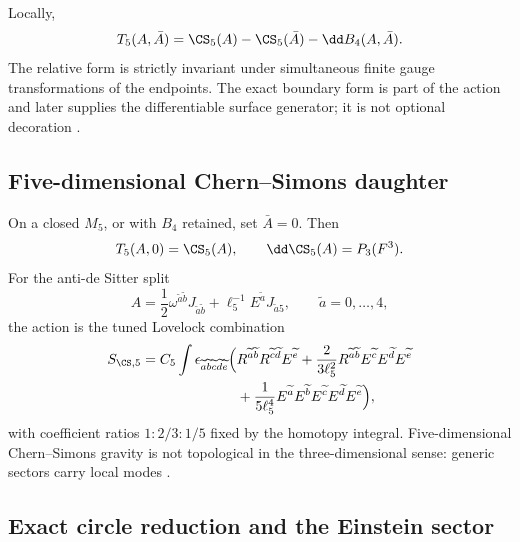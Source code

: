 Locally,
\[
T_5(A,\bar A)=\CS_5(A)-\CS_5(\bar A)-\dd B_4(A,\bar A).
\]
The relative form is strictly invariant under simultaneous finite gauge transformations of the endpoints.  The exact boundary form is part of the action and later supplies the differentiable surface generator; it is not optional decoration \citep{MoraOleaTroncosoZanelli2006,PaisSalgadoRebolledoVera2023}.

\subsection{Five-dimensional Chern--Simons daughter}

On a closed $M_5$, or with $B_4$ retained, set $\bar A=0$.  Then
\[
T_5(A,0)=\CS_5(A),
\qquad
\dd\CS_5(A)=P_3(F^3).
\]
For the anti-de Sitter split
\[
A=\frac12\omega^{\widetilde a\widetilde b}J_{\widetilde a\widetilde b}
+\ell_5^{-1}E^{\widetilde a}J_{\widetilde a5},
\qquad \widetilde a=0,\ldots,4,
\]
the action is the tuned Lovelock combination
\[
\begin{aligned}
S_{\CS,5}=C_5\int\epsilon_{\widetilde a\widetilde b\widetilde c\widetilde d\widetilde e}
\Big(&R^{\widetilde a\widetilde b}R^{\widetilde c\widetilde d}E^{\widetilde e}
+\frac{2}{3\ell_5^2}R^{\widetilde a\widetilde b}E^{\widetilde c}E^{\widetilde d}E^{\widetilde e}\\
&+\frac{1}{5\ell_5^4}E^{\widetilde a}E^{\widetilde b}E^{\widetilde c}E^{\widetilde d}E^{\widetilde e}\Big),
\end{aligned}
\]
with coefficient ratios $1:2/3:1/5$ fixed by the homotopy integral.  Five-dimensional Chern--Simons gravity is not topological in the three-dimensional sense: generic sectors carry local modes \citep{Chamseddine1989,BanadosGarayHenneaux1995,BanadosGarayHenneaux1996}.

\subsection{Exact circle reduction and the Einstein sector}

